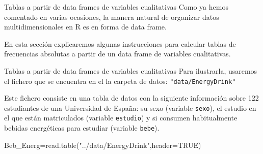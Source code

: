 \documentclass[
  ignorenonframetext,
  aspectratio=169]{beamer}
\newenvironment{Shaded}{\begin{snugshade}}{\end{snugshade}}
\newcommand{\AttributeTok}[1]{\textcolor[rgb]{0.77,0.63,0.00}{#1}}
\newcommand{\ConstantTok}[1]{\textcolor[rgb]{0.00,0.00,0.00}{#1}}
\newcommand{\FunctionTok}[1]{\textcolor[rgb]{0.00,0.00,0.00}{#1}}
\newcommand{\NormalTok}[1]{#1}
\newcommand{\OtherTok}[1]{\textcolor[rgb]{0.56,0.35,0.01}{#1}}
\newcommand{\StringTok}[1]{\textcolor[rgb]{0.31,0.60,0.02}{#1}}
\begin{document}
\begin{frame}{Tablas a partir de data frames de variables cualitativas}
\protect\hypertarget{tablas-a-partir-de-data-frames-de-variables-cualitativas}{}
Como ya hemos comentado en varias ocasiones, la manera natural de
organizar datos multidimensionales en R es en forma de data frame.

En esta sección explicaremos algunas instrucciones para calcular tablas
de frecuencias absolutas a partir de un data frame de variables
cualitativas.
\end{frame}

\begin{frame}[fragile]{Tablas a partir de data frames de variables
cualitativas}
\protect\hypertarget{tablas-a-partir-de-data-frames-de-variables-cualitativas-1}{}
Para ilustrarla, usaremos el fichero que se encuentra en el la carpeta
de datos: \texttt{"data/EnergyDrink"}

Este fichero consiste en una tabla de datos con la siguiente información
sobre 122 estudiantes de una Universidad de España: su sexo (variable
\texttt{sexo}), el estudio en el que están matriculados (variable
\texttt{estudio}) y si consumen habitualmente bebidas energéticas para
estudiar (variable \texttt{bebe}).

\begin{Shaded}
\begin{Highlighting}[]
\NormalTok{Beb\_Energ}\OtherTok{=}\FunctionTok{read.table}\NormalTok{(}\StringTok{"../data/EnergyDrink"}\NormalTok{,}\AttributeTok{header=}\ConstantTok{TRUE}\NormalTok{)}
\end{Highlighting}
\end{Shaded}
\end{frame}
\end{document}
